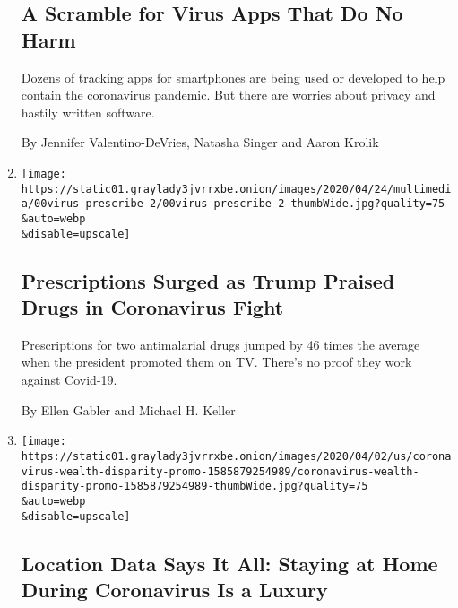 \begin{enumerate}
  \hypertarget{a-scramble-for-virus-apps-that-do-no-harm}{%
  \subsection{A Scramble for Virus Apps That Do No
  Harm}\label{a-scramble-for-virus-apps-that-do-no-harm}}

  Dozens of tracking apps for smartphones are being used or developed to
  help contain the coronavirus pandemic. But there are worries about
  privacy and hastily written software.

  By Jennifer Valentino-DeVries, Natasha Singer and Aaron Krolik
\item
  \href{/2020/04/25/us/coronavirus-trump-chloroquine-hydroxychloroquine.html}{}

  \texttt{[image: https://static01.graylady3jvrrxbe.onion/images/2020/04/24/multimedia/00virus-prescribe-2/00virus-prescribe-2-thumbWide.jpg?quality=75\\\&auto=webp\\\&disable=upscale]}

  \hypertarget{prescriptions-surged-as-trump-praised-drugs-in-coronavirus-fight}{%
  \subsection{Prescriptions Surged as Trump Praised Drugs in Coronavirus
  Fight}\label{prescriptions-surged-as-trump-praised-drugs-in-coronavirus-fight}}

  Prescriptions for two antimalarial drugs jumped by 46 times the
  average when the president promoted them on TV. There's no proof they
  work against Covid-19.

  By Ellen Gabler and Michael H. Keller
\item
  \href{/interactive/2020/04/03/us/coronavirus-stay-home-rich-poor.html}{}

  \texttt{[image: https://static01.graylady3jvrrxbe.onion/images/2020/04/02/us/coronavirus-wealth-disparity-promo-1585879254989/coronavirus-wealth-disparity-promo-1585879254989-thumbWide.jpg?quality=75\\\&auto=webp\\\&disable=upscale]}

  \hypertarget{location-data-says-it-all-staying-at-home-during-coronavirus-is-a-luxury}{%
  \subsection{Location Data Says It All: Staying at Home During
  Coronavirus Is a
  Luxury}\label{location-data-says-it-all-staying-at-home-during-coronavirus-is-a-luxury}}


\end{enumerate}
